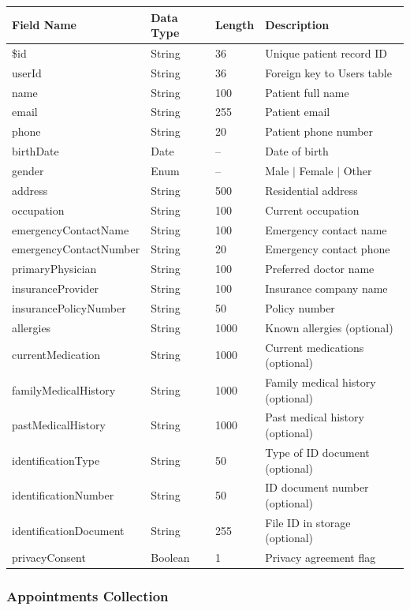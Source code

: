 \documentclass[11pt,a4paper]{article}
\begin{document}
\begin{longtable}{|p{3.5cm}|p{2cm}|p{1.5cm}|p{6cm}|}
\hline
\textbf{Field Name} & \textbf{Data Type} & \textbf{Length} & \textbf{Description} \\
\hline
\$id & String & 36 & Unique patient record ID \\
userId & String & 36 & Foreign key to Users table \\
name & String & 100 & Patient full name \\
email & String & 255 & Patient email \\
phone & String & 20 & Patient phone number \\
birthDate & Date & -- & Date of birth \\
gender & Enum & -- & Male $|$ Female $|$ Other \\
address & String & 500 & Residential address \\
occupation & String & 100 & Current occupation \\
emergencyContactName & String & 100 & Emergency contact name \\
emergencyContactNumber & String & 20 & Emergency contact phone \\
primaryPhysician & String & 100 & Preferred doctor name \\
insuranceProvider & String & 100 & Insurance company name \\
insurancePolicyNumber & String & 50 & Policy number \\
allergies & String & 1000 & Known allergies (optional) \\
currentMedication & String & 1000 & Current medications (optional) \\
familyMedicalHistory & String & 1000 & Family medical history (optional) \\
pastMedicalHistory & String & 1000 & Past medical history (optional) \\
identificationType & String & 50 & Type of ID document (optional) \\
identificationNumber & String & 50 & ID document number (optional) \\
identificationDocument & String & 255 & File ID in storage (optional) \\
privacyConsent & Boolean & 1 & Privacy agreement flag \\
\hline
\end{longtable}

\subsubsection{Appointments Collection}
\end{document}
